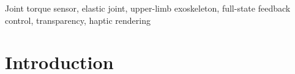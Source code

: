 \documentclass[journal]{IEEEtran}
\begin{document}
\begin{IEEEkeywords}
Joint torque sensor, elastic joint, upper-limb exoskeleton, full-state feedback control, transparency, haptic rendering
\end{IEEEkeywords}






%
\IEEEpeerreviewmaketitle

\section{Introduction}
\end{document}
